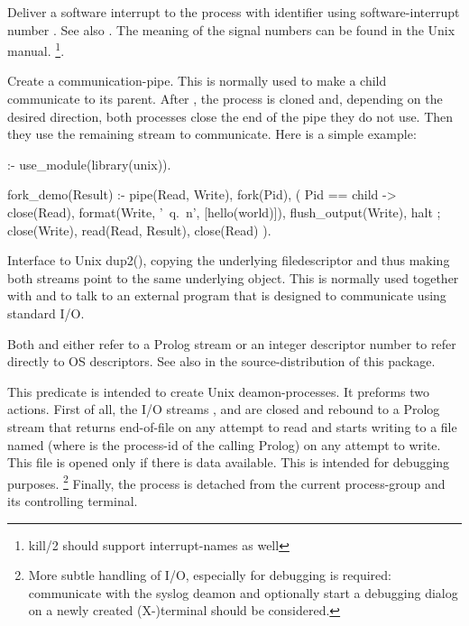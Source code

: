 \documentclass[11pt]{article}
\begin{document}
\begin{description}
Deliver a software interrupt to the process with identifier 
using software-interrupt number .  See also .
The meaning of the signal numbers can be found in the Unix manual.%
\footnote{kill/2 should support interrupt-names as well}.

Create a communication-pipe. This is normally used to make a child
communicate to its parent. After , the process is cloned and,
depending on the desired direction, both processes close the end of the
pipe they do not use. Then they use the remaining stream to communicate.
Here is a simple example:

\begin{code}
:- use_module(library(unix)).

fork_demo(Result) :-
        pipe(Read, Write),
        fork(Pid),
        (   Pid == child
        ->  close(Read),
            format(Write, '~q.~n',
                   [hello(world)]),
            flush_output(Write),
            halt
        ;   close(Write),
            read(Read, Result),
            close(Read)
        ).
\end{code}

\noindent
Interface to Unix dup2(), copying the underlying filedescriptor and thus
making both streams point to the same underlying object. This is
normally used together with  and  to talk to an external
program that is designed to communicate using standard I/O.

Both  and  either refer to a Prolog stream
or an integer descriptor number to refer directly to OS descriptors.
See also  in the source-distribution of this package.

This predicate is intended to create Unix deamon-processes. It preforms
two actions.  First of all, the I/O streams , 
 and  are closed and rebound to
a Prolog stream that returns end-of-file on any attempt to read and
starts writing to a file named  (where  is
the process-id of the calling Prolog) on any attempt
to write.  This file is opened only if there is data available.  This is
intended for debugging purposes.%
    \footnote{More subtle handling of I/O, especially for debugging is
	      required: communicate with the syslog deamon and
	      optionally start a debugging dialog on a newly created
	      (X-)terminal should be considered.}
Finally, the process is detached from the current process-group and its
controlling terminal.
\end{description}
\end{document}
